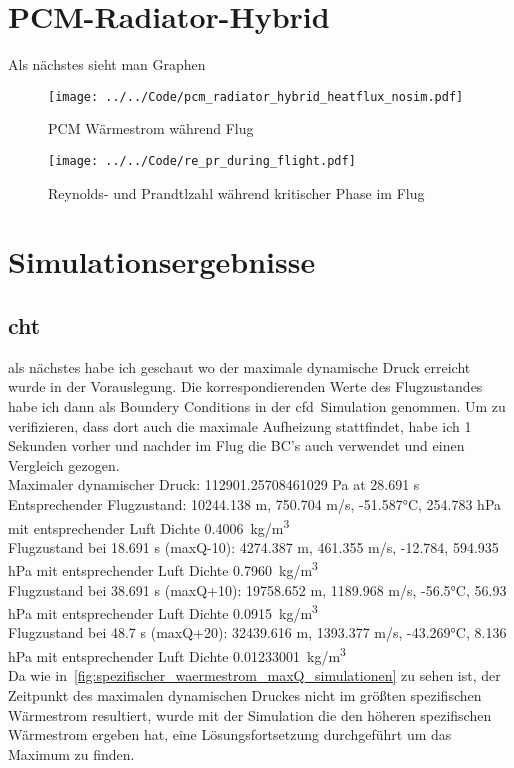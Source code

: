 \section{PCM-Radiator-Hybrid}\label{sec:pcmRadiatorHybridErgebnisse}

Als nächstes sieht man Graphen

\begin{figure}[H]
  \centering
  \texttt{[image: ../../Code/pcm\_radiator\_hybrid\_heatflux\_nosim.pdf]}\label{fig:pcm_waermestrom_vorauslegung}
  \caption{PCM Wärmestrom während Flug}
  \texttt{[image: ../../Code/re\_pr\_during\_flight.pdf]}\label{fig:re_pr_flugsimulation}
  \caption{Reynolds- und Prandtlzahl während kritischer Phase im Flug}
\end{figure}

\section{Simulationsergebnisse}

\subsection{\texorpdfstring{\ac{cht}}{CHT}}

als nächstes habe ich geschaut wo der maximale dynamische Druck erreicht wurde in der Vorauslegung. Die korrespondierenden Werte des Flugzustandes
habe ich dann als Boundery Conditions in der \ac{cfd}~Simulation genommen.
Um zu verifizieren, dass dort auch die maximale Aufheizung stattfindet, habe ich 1 Sekunden vorher und nachder
im Flug die BC's auch verwendet und einen Vergleich gezogen.\\
Maximaler dynamischer Druck: 112901.25708461029 Pa at 28.691 s\\
Entsprechender Flugzustand: 10244.138 m, 750.704 m/s, -51.587°C, 254.783 hPa mit entsprechender Luft Dichte \SI{0.4006}{kg/m^3}\\
Flugzustand bei 18.691 s (maxQ-10): 4274.387 m, 461.355 m/s, -12.784, 594.935 hPa mit entsprechender Luft Dichte \SI{0.7960}{kg/m^3}\\
Flugzustand bei 38.691 s (maxQ+10): 19758.652 m, 1189.968 m/s, -56.5°C, 56.93 hPa mit entsprechender Luft Dichte \SI{0.0915}{kg/m^3}\\
Flugzustand bei 48.7 s (maxQ+20): 32439.616 m, 1393.377 m/s, -43.269°C, 8.136 hPa mit entsprechender Luft Dichte \SI{0.01233001}{kg/m^3}\\
Da wie in~\ref{fig:spezifischer_waermestrom_maxQ_simulationen} zu sehen ist, der Zeitpunkt des maximalen dynamischen Druckes nicht im größten spezifischen
Wärmestrom resultiert, wurde mit der Simulation die den höheren spezifischen Wärmestrom ergeben hat, eine Lösungsfortsetzung durchgeführt um das Maximum zu finden.\\

